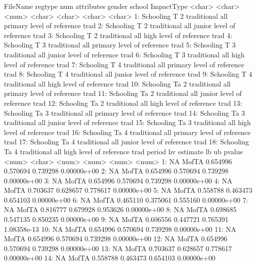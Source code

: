 \begin{Schunk}
\begin{Soutput}
     FileName regtype   num  attributes gender  school              ImpactType
       <char>  <char> <num>      <char> <char>  <char>                  <char>
 1: Schooling       T     2 traditional    all primary level of reference trad
 2: Schooling       T     2 traditional    all  junior level of reference trad
 3: Schooling       T     2 traditional    all    high level of reference trad
 4: Schooling       T     3 traditional    all primary level of reference trad
 5: Schooling       T     3 traditional    all  junior level of reference trad
 6: Schooling       T     3 traditional    all    high level of reference trad
 7: Schooling       T     4 traditional    all primary level of reference trad
 8: Schooling       T     4 traditional    all  junior level of reference trad
 9: Schooling       T     4 traditional    all    high level of reference trad
10: Schooling      Ta     2 traditional    all primary level of reference trad
11: Schooling      Ta     2 traditional    all  junior level of reference trad
12: Schooling      Ta     2 traditional    all    high level of reference trad
13: Schooling      Ta     3 traditional    all primary level of reference trad
14: Schooling      Ta     3 traditional    all  junior level of reference trad
15: Schooling      Ta     3 traditional    all    high level of reference trad
16: Schooling      Ta     4 traditional    all primary level of reference trad
17: Schooling      Ta     4 traditional    all  junior level of reference trad
18: Schooling      Ta     4 traditional    all    high level of reference trad
    period     hv estimate       lb       ub      pvalue
     <num> <char>    <num>    <num>    <num>       <num>
 1:     NA  MofTA 0.654996 0.570694 0.739298 0.00000e+00
 2:     NA  MofTA 0.654996 0.570694 0.739298 0.00000e+00
 3:     NA  MofTA 0.654996 0.570694 0.739298 0.00000e+00
 4:     NA  MofTA 0.703637 0.628657 0.778617 0.00000e+00
 5:     NA  MofTA 0.558788 0.463473 0.654103 0.00000e+00
 6:     NA  MofTA 0.465110 0.375061 0.555160 0.00000e+00
 7:     NA  MofTA 0.816777 0.679928 0.953626 0.00000e+00
 8:     NA  MofTA 0.698685 0.547135 0.850235 0.00000e+00
 9:     NA  MofTA 0.606556 0.447721 0.765391 1.08358e-13
10:     NA  MofTA 0.654996 0.570694 0.739298 0.00000e+00
11:     NA  MofTA 0.654996 0.570694 0.739298 0.00000e+00
12:     NA  MofTA 0.654996 0.570694 0.739298 0.00000e+00
13:     NA  MofTA 0.703637 0.628657 0.778617 0.00000e+00
14:     NA  MofTA 0.558788 0.463473 0.654103 0.00000e+00

\end{Soutput}
\end{Schunk}
